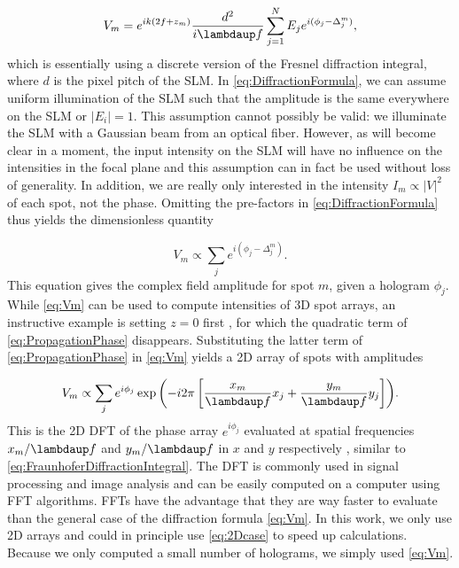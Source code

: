 \begin{equation}\label{eq:DiffractionFormula}
    V_m = e^{i k \left(2 f + z_m\right)}
    \frac{d^2}{i \lambdaup f} \sum_{j=1}^N E_j e^{i(\phi_j - \Delta_j^m)},
\end{equation}
which is essentially using a discrete version of the Fresnel diffraction integral, where $d$ is the pixel pitch of the SLM. 
In \cref{eq:DiffractionFormula}, we can assume uniform illumination of the SLM such that the amplitude is the same everywhere on the SLM or $|E_i| = 1$.
This assumption cannot possibly be valid: we illuminate the SLM with a Gaussian beam from an optical fiber.
However, as will become clear in a moment, the input intensity on the SLM will have no influence on the intensities in the focal plane and this assumption can in fact be used without loss of generality.
In addition, we are really only interested in the intensity $I_m \propto |V|^2$ of each spot, not the phase.
Omitting the pre-factors in \cref{eq:DiffractionFormula} thus yields the dimensionless quantity \cite{DiLeonardo2007}

\begin{equation}\label{eq:Vm}
    V_m \propto \sum_{j} e^{i(\phi_j - \Delta_j^m)}.
\end{equation}
This equation gives the complex field amplitude for spot $m$, given a hologram $\phi_j$.
While \cref{eq:Vm} can be used to compute intensities of 3D spot arrays, an instructive example is setting $z=0$ first \cite{DiLeonardo2007}, for which the quadratic term of \cref{eq:PropagationPhase} disappears.
Substituting the latter term of \cref{eq:PropagationPhase} in \cref{eq:Vm} yields a 2D array of spots with amplitudes 

\begin{equation}\label{eq:2Dcase}
    V_m \propto \sum_j e^{i\phi_j} \exp{\left(
    - i 2\pi \left[
    \frac{x_m}{\lambdaup f} x_j + \frac{y_m}{\lambdaup f} y_j
    \right]
    \right)}.
\end{equation}
This is the 2D \ac{DFT} of the phase array $e^{i\phi_j}$ evaluated at spatial frequencies $x_m/\lambdaup f$ and $y_m/\lambdaup f$ in $x$ and $y$ respectively \cite{Bijnen2015,DiLeonardo2007}, similar to \cref{eq:FraunhoferDiffractionIntegral}.
The DFT is commonly used in signal processing and image analysis and can be easily computed on a computer using \ac{FFT} algorithms. 
FFTs have the advantage that they are way faster to evaluate than the general case of the diffraction formula \cref{eq:Vm}.
In this work, we only use 2D arrays and could in principle use \cref{eq:2Dcase} to speed up calculations.
Because we only computed a small number of holograms, we simply used \cref{eq:Vm}.

